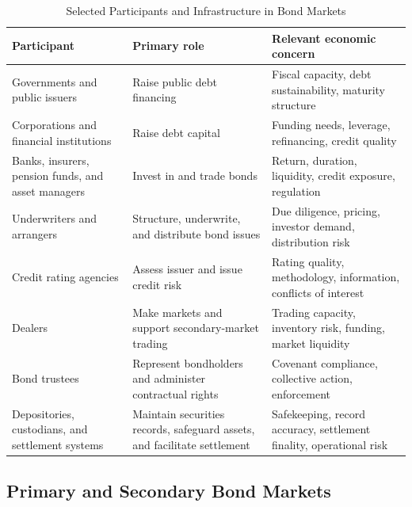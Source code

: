 \begin{table}[H]
\centering
\caption{Selected Participants and Infrastructure in Bond Markets}
\label{tab:ch8-market-participants}

\begin{tabularx}{\textwidth}{@{}p{3.1cm}Y Y@{}}
\toprule
\textbf{Participant} &
\textbf{Primary role} &
\textbf{Relevant economic concern} \\
\midrule

Governments and public issuers
& Raise public debt financing
& Fiscal capacity, debt sustainability, maturity structure \\

Corporations and financial institutions
& Raise debt capital
& Funding needs, leverage, refinancing, credit quality \\

Banks, insurers, pension funds, and asset managers
& Invest in and trade bonds
& Return, duration, liquidity, credit exposure, regulation \\

Underwriters and arrangers
& Structure, underwrite, and distribute bond issues
& Due diligence, pricing, investor demand, distribution risk \\

Credit rating agencies
& Assess issuer and issue credit risk
& Rating quality, methodology, information, conflicts of interest \\

Dealers
& Make markets and support secondary-market trading
& Trading capacity, inventory risk, funding, market liquidity \\

Bond trustees
& Represent bondholders and administer contractual rights
& Covenant compliance, collective action, enforcement \\

Depositories, custodians, and settlement systems
& Maintain securities records, safeguard assets, and facilitate settlement
& Safekeeping, record accuracy, settlement finality, operational risk \\

\bottomrule
\end{tabularx}
\end{table}

\subsection{Primary and Secondary Bond Markets}

